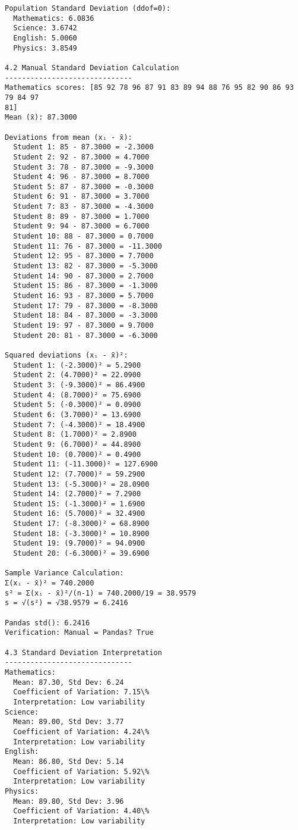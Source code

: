 \documentclass[11pt]{article}
\begin{document}
\begin{Verbatim}[commandchars=\\\{\}]
Population Standard Deviation (ddof=0):
  Mathematics: 6.0836
  Science: 3.6742
  English: 5.0060
  Physics: 3.8549

4.2 Manual Standard Deviation Calculation
------------------------------
Mathematics scores: [85 92 78 96 87 91 83 89 94 88 76 95 82 90 86 93 79 84 97
81]
Mean (x̄): 87.3000

Deviations from mean (xᵢ - x̄):
  Student 1: 85 - 87.3000 = -2.3000
  Student 2: 92 - 87.3000 = 4.7000
  Student 3: 78 - 87.3000 = -9.3000
  Student 4: 96 - 87.3000 = 8.7000
  Student 5: 87 - 87.3000 = -0.3000
  Student 6: 91 - 87.3000 = 3.7000
  Student 7: 83 - 87.3000 = -4.3000
  Student 8: 89 - 87.3000 = 1.7000
  Student 9: 94 - 87.3000 = 6.7000
  Student 10: 88 - 87.3000 = 0.7000
  Student 11: 76 - 87.3000 = -11.3000
  Student 12: 95 - 87.3000 = 7.7000
  Student 13: 82 - 87.3000 = -5.3000
  Student 14: 90 - 87.3000 = 2.7000
  Student 15: 86 - 87.3000 = -1.3000
  Student 16: 93 - 87.3000 = 5.7000
  Student 17: 79 - 87.3000 = -8.3000
  Student 18: 84 - 87.3000 = -3.3000
  Student 19: 97 - 87.3000 = 9.7000
  Student 20: 81 - 87.3000 = -6.3000

Squared deviations (xᵢ - x̄)²:
  Student 1: (-2.3000)² = 5.2900
  Student 2: (4.7000)² = 22.0900
  Student 3: (-9.3000)² = 86.4900
  Student 4: (8.7000)² = 75.6900
  Student 5: (-0.3000)² = 0.0900
  Student 6: (3.7000)² = 13.6900
  Student 7: (-4.3000)² = 18.4900
  Student 8: (1.7000)² = 2.8900
  Student 9: (6.7000)² = 44.8900
  Student 10: (0.7000)² = 0.4900
  Student 11: (-11.3000)² = 127.6900
  Student 12: (7.7000)² = 59.2900
  Student 13: (-5.3000)² = 28.0900
  Student 14: (2.7000)² = 7.2900
  Student 15: (-1.3000)² = 1.6900
  Student 16: (5.7000)² = 32.4900
  Student 17: (-8.3000)² = 68.8900
  Student 18: (-3.3000)² = 10.8900
  Student 19: (9.7000)² = 94.0900
  Student 20: (-6.3000)² = 39.6900

Sample Variance Calculation:
Σ(xᵢ - x̄)² = 740.2000
s² = Σ(xᵢ - x̄)²/(n-1) = 740.2000/19 = 38.9579
s = √(s²) = √38.9579 = 6.2416

Pandas std(): 6.2416
Verification: Manual = Pandas? True

4.3 Standard Deviation Interpretation
------------------------------
Mathematics:
  Mean: 87.30, Std Dev: 6.24
  Coefficient of Variation: 7.15\%
  Interpretation: Low variability
Science:
  Mean: 89.00, Std Dev: 3.77
  Coefficient of Variation: 4.24\%
  Interpretation: Low variability
English:
  Mean: 86.80, Std Dev: 5.14
  Coefficient of Variation: 5.92\%
  Interpretation: Low variability
Physics:
  Mean: 89.80, Std Dev: 3.96
  Coefficient of Variation: 4.40\%
  Interpretation: Low variability


\end{Verbatim}
\end{document}
